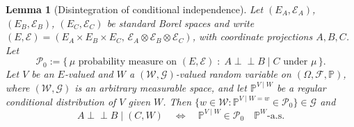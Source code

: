 \documentclass[10pt,a4paper]{amsart}
\newtheorem{lemma}{Lemma}
\newcommand{\indep}{\perp \!\!\! \perp}
\begin{document}
\begin{lemma}[Disintegration of conditional independence]
\label{lem:disintegration-general}
Let $(E_A,\mathcal{E}_A)$, $(E_B,\mathcal{E}_B)$, $(E_C,\mathcal{E}_C)$ be
standard Borel spaces and write
$(E,\mathcal{E}) = (E_A\times E_B\times E_C,\,
\mathcal{E}_A\otimes\mathcal{E}_B\otimes\mathcal{E}_C)$, with coordinate
projections $A,B,C$. Let
\[
  \mathcal{P}_0 := \bigl\{\,\mu \text{ probability measure on }(E,\mathcal{E})
  \;:\; A \indep B \mid C \text{ under } \mu \,\bigr\}.
\]
Let $V$ be an $E$-valued and $W$ a $(\mathcal{W},\mathcal{G})$-valued random
variable on $(\Omega,\mathcal{F},\mathbb{P})$, where $(\mathcal{W},\mathcal{G})$
is an arbitrary measurable space, and let $\mathbb{P}^{V\mid W}$ be a regular
conditional distribution of $V$ given $W$. Then
$\{w\in\mathcal{W}:\mathbb{P}^{V\mid W=w}\in\mathcal{P}_0\}\in\mathcal{G}$ and
\[
  A \indep B \mid (C,W)
  \quad\Longleftrightarrow\quad
  \mathbb{P}^{V\mid W}\in\mathcal{P}_0 \quad \mathbb{P}^{W}\text{-a.s.}
\]
\end{lemma}
\end{document}

